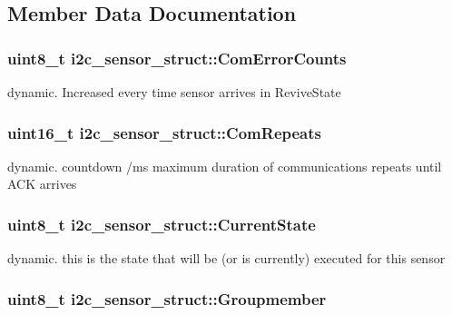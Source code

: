 \subsection{Member Data Documentation}
\hypertarget{structi2c__sensor__struct_ad285dbe48014bc48d9235787793cd6bf}{
\subsubsection[{Com\-Error\-Counts}]{\setlength{\rightskip}{0pt plus 5cm}uint8\-\_\-t i2c\-\_\-sensor\-\_\-struct\-::\-Com\-Error\-Counts}}\label{structi2c__sensor__struct_ad285dbe48014bc48d9235787793cd6bf}
dynamic. Increased every time sensor arrives in Revive\-State \hypertarget{structi2c__sensor__struct_ac0c117558f105e569de3c5d34a3d18d9}{
\subsubsection[{Com\-Repeats}]{\setlength{\rightskip}{0pt plus 5cm}uint16\-\_\-t i2c\-\_\-sensor\-\_\-struct\-::\-Com\-Repeats}}\label{structi2c__sensor__struct_ac0c117558f105e569de3c5d34a3d18d9}
dynamic. countdown /ms maximum duration of communications repeats until A\-C\-K arrives \hypertarget{structi2c__sensor__struct_a4e112bbb4d5a6b493aa388e874c52480}{
\subsubsection[{Current\-State}]{\setlength{\rightskip}{0pt plus 5cm}uint8\-\_\-t i2c\-\_\-sensor\-\_\-struct\-::\-Current\-State}}\label{structi2c__sensor__struct_a4e112bbb4d5a6b493aa388e874c52480}
dynamic. this is the state that will be (or is currently) executed for this sensor \hypertarget{structi2c__sensor__struct_af3641e8d736b7a55bf47cecca625b457}{
\subsubsection[{Groupmember}]{\setlength{\rightskip}{0pt plus 5cm}uint8\-\_\-t i2c\-\_\-sensor\-\_\-struct\-::\-Groupmember}}\label{structi2c__sensor__struct_af3641e8d736b7a55bf47cecca625b457}
